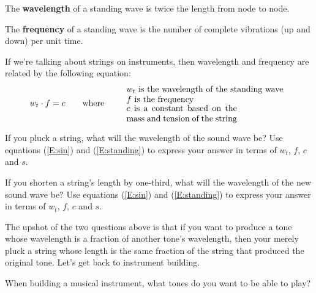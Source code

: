\begin{dfn} 
The \textbf{wavelength} of a standing
wave is twice the length from node to node.
\end{dfn}

\begin{dfn} 
The \textbf{frequency} of a standing
wave is the number of complete vibrations (up and down) per unit time.
\end{dfn}

If we're talking about strings on instruments, then wavelength and
frequency are related by the following equation:
\begin{equation}\label{E:standing}
w_t \cdot f = c\qquad\text{where}\qquad
\begin{tabular}{l}
$w_t$ is the wavelength of the standing wave \\
$f$ is the frequency \\
\begin{minipage}{30ex}$c$ is a constant based on the mass and tension of the string\end{minipage}
\end{tabular}
\end{equation}

\begin{ques} 
If you pluck a string, what will the wavelength of the sound wave be?
Use equations (\ref{E:sin}) and (\ref{E:standing}) to express your
answer in terms of $w_t$, $f$, $c$ and $s$.
\end{ques}
\QM


\begin{ques} 
If you shorten a string's length by one-third, what will the
wavelength of the new sound wave be?  Use equations (\ref{E:sin}) and
(\ref{E:standing}) to express your answer in terms of $w_t$, $f$, $c$
and $s$.
\end{ques}
\QM

The upshot of the two questions above is that if you want to produce a
tone whose wavelength is a fraction of another tone's wavelength, then
your merely pluck a string whose length is the same fraction of the
string that produced the original tone. Let's get back to instrument building.

\begin{ques} 
When building a musical instrument, what tones do you want to be able
to play?
\end{ques}


